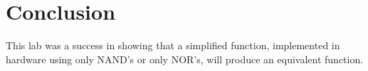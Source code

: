 \documentclass[12pt]{article}
\begin{document}
\section{Conclusion}

This lab was a success in showing that a simplified function,
implemented in hardware using only NAND's or only NOR's,
will produce an equivalent function.


%
%

\end{document}
